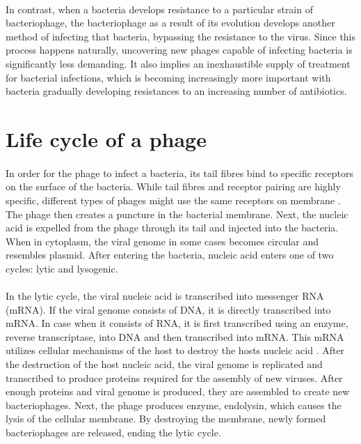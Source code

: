 \paragraph*{}
In contrast, when a bacteria develops resistance to a particular strain of bacteriophage, the bacteriophage as a result of its evolution develops another method of infecting that bacteria, bypassing the resistance to the virus. Since this process happens naturally, uncovering new phages capable of infecting bacteria is significantly less demanding. It also implies an inexhaustible supply of treatment for bacterial infections, which is becoming increasingly more important with bacteria gradually developing resistances to an increasing number of antibiotics.

\section{Life cycle of a phage}
\paragraph*{}
In order for the phage to infect a bacteria, its tail fibres bind to specific receptors on the surface of the bacteria. While tail fibres and receptor pairing are highly specific, different types of phages might use the same receptors on membrane \cite{guttman2005basic}. The phage then creates a puncture in the bacterial membrane. Next, the nucleic acid is expelled from the phage through its tail and injected into the bacteria. When in cytoplasm, the viral genome in some cases becomes circular and resembles plasmid. After entering the bacteria, nucleic acid enters one of two cycles: lytic and lysogenic.
\paragraph*{}
In the lytic cycle, the viral nucleic acid is transcribed into messenger RNA (mRNA). If the viral genome consists of DNA, it is directly transcribed into mRNA. In case when it consists of RNA, it is first transcribed using an enzyme, reverse transcriptase, into DNA and then transcribed into mRNA. This mRNA utilizes cellular mechanisms of the host to destroy the hosts nucleic acid \cite{guttman2005basic}. After the destruction of the host nucleic acid, the viral genome is replicated and transcribed to produce proteins required for the assembly of new viruses. After enough proteins and viral genome is produced, they are assembled to create new bacteriophages. Next, the phage produces enzyme, endolysin, which causes the lysis of the cellular membrane. By destroying the membrane, newly formed bacteriophages are released, ending the lytic cycle.
